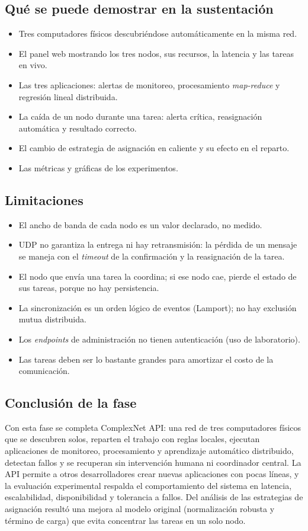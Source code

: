 \subsection{Qué se puede demostrar en la sustentación}

\begin{itemize}
\item Tres computadores físicos descubriéndose automáticamente en la misma red.
\item El panel web mostrando los tres nodos, sus recursos, la latencia y las tareas en vivo.
\item Las tres aplicaciones: alertas de monitoreo, procesamiento \emph{map-reduce} y regresión
lineal distribuida.
\item La caída de un nodo durante una tarea: alerta crítica, reasignación automática y resultado
correcto.
\item El cambio de estrategia de asignación en caliente y su efecto en el reparto.
\item Las métricas y gráficas de los experimentos.
\end{itemize}

\subsection{Limitaciones}

\begin{itemize}
\item El ancho de banda de cada nodo es un valor declarado, no medido.
\item UDP no garantiza la entrega ni hay retransmisión: la pérdida de un mensaje se maneja con el
\emph{timeout} de la confirmación y la reasignación de la tarea.
\item El nodo que envía una tarea la coordina; si ese nodo cae, pierde el estado de sus tareas, porque
no hay persistencia.
\item La sincronización es un orden lógico de eventos (Lamport); no hay exclusión mutua distribuida.
\item Los \emph{endpoints} de administración no tienen autenticación (uso de laboratorio).
\item Las tareas deben ser lo bastante grandes para amortizar el costo de la comunicación.
\end{itemize}

\subsection{Conclusión de la fase}

Con esta fase se completa ComplexNet API: una red de tres computadores físicos que se descubren solos,
reparten el trabajo con reglas locales, ejecutan aplicaciones de monitoreo, procesamiento y
aprendizaje automático distribuido, detectan fallos y se recuperan sin intervención humana ni
coordinador central. La API permite a otros desarrolladores crear nuevas aplicaciones con pocas líneas,
y la evaluación experimental respalda el comportamiento del sistema en latencia, escalabilidad,
disponibilidad y tolerancia a fallos. Del análisis de las estrategias de asignación resultó una mejora
al modelo original (normalización robusta y término de carga) que evita concentrar las tareas en un
solo nodo.
